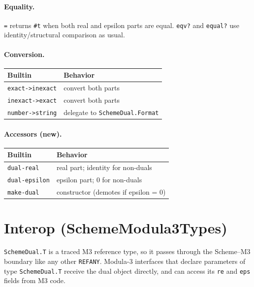 \documentclass[12pt]{report}
\begin{document}
\paragraph{Equality.}
{\tt =} returns {\tt \#t} when both real and epsilon parts are equal.
{\tt eqv?} and {\tt equal?} use identity/structural comparison as usual.

\paragraph{Conversion.}

\begin{center}
\begin{tabular}{ll}
\toprule
Builtin & Behavior \\
\midrule
{\tt exact->inexact} & convert both parts \\
{\tt inexact->exact} & convert both parts \\
{\tt number->string} & delegate to {\tt SchemeDual.Format} \\
\bottomrule
\end{tabular}
\end{center}

\paragraph{Accessors (new).}

\begin{center}
\begin{tabular}{ll}
\toprule
Builtin & Behavior \\
\midrule
{\tt dual-real}    & real part; identity for non-duals \\
{\tt dual-epsilon} & epsilon part; 0 for non-duals \\
{\tt make-dual}    & constructor (demotes if epsilon = 0) \\
\bottomrule
\end{tabular}
\end{center}

\section{Interop (SchemeModula3Types)}

{\tt SchemeDual.T} is a traced M3 reference type, so it passes
through the Scheme--M3 boundary like any other {\tt REFANY}.
Modula-3 interfaces that declare parameters of type
{\tt SchemeDual.T} receive the dual object directly, and can
access its {\tt re} and {\tt eps} fields from M3 code.
\end{document}
